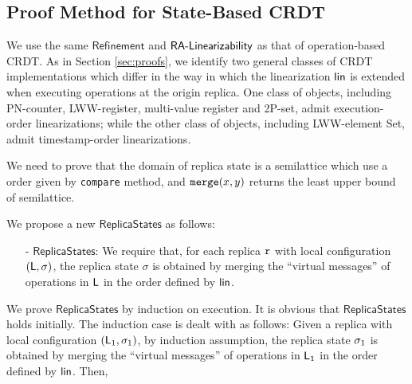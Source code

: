 \subsection{Proof Method for State-Based CRDT}
\label{subsec:proof method for state-based CRDT}

We use the same $\mathsf{Refinement}$ and $\mathsf{\CRDTLinshort{}}$ as that of operation-based CRDT. As in Section \ref{sec:proofs}, we identify two general classes of CRDT implementations which differ in the way in which the linearization $\alinord$ is extended when executing operations at the origin replica. One class of objects, including PN-counter, LWW-register, multi-value register and 2P-set, admit execution-order linearizations; while the other class of objects, including LWW-element Set, admit timestamp-order linearizations.

We need to prove that the domain of replica state is a semilattice which use a order given by {\tt compare} method, and $\alabelshort[\mathtt{merge}]{x,y}$ returns the least upper bound of semilattice.

We propose a new $\mathsf{ReplicaStates}$ as follows:

\begin{itemize}
\setlength{\itemsep}{0.5pt}
\item[-] $\mathsf{ReplicaStates}$: We require that, for each replica $\arep$ with local configuration $(\alabelset,\astate)$, the replica state $\sigma$ is obtained by merging the ``virtual messages'' of operations in $\alabelset$ in the order defined by $\alinord$.
\end{itemize}

We prove $\mathsf{ReplicaStates}$ by induction on execution. It is obvious that $\mathsf{ReplicaStates}$ holds initially. The induction case is dealt with as follows: Given a replica with local configuration $(\alabelset_1,\astate_1)$, by induction assumption, the replica state $\astate_1$ is obtained by merging the ``virtual messages'' of operations in $\alabelset_1$ in the order defined by $\alinord$. Then,

